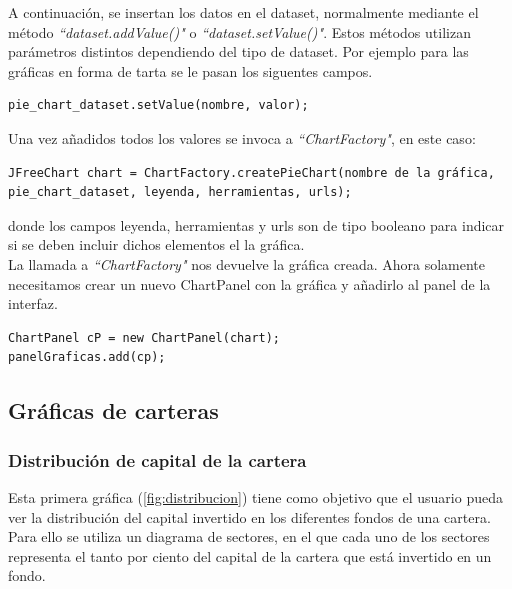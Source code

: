 \documentclass[12pt, a4paper]{book}
\begin{document}
A continuación, se insertan los datos en el dataset, normalmente mediante el método \textit{``dataset.addValue()"} o \textit{``dataset.setValue()"}. Estos métodos utilizan parámetros distintos dependiendo del tipo de dataset. Por ejemplo para las gráficas en forma de tarta se le pasan los siguentes campos.

\begin{verbatim}
pie_chart_dataset.setValue(nombre, valor);
\end{verbatim}

Una vez añadidos todos los valores se invoca a \textit{``ChartFactory"}, en este caso: 

\begin{verbatim}
JFreeChart chart = ChartFactory.createPieChart(nombre de la gráfica,
pie_chart_dataset, leyenda, herramientas, urls);
\end{verbatim}
donde los campos leyenda, herramientas y urls son de tipo booleano para indicar si se deben incluir dichos elementos el la gráfica.\\

La llamada a \textit{``ChartFactory"} nos devuelve la gráfica creada. Ahora solamente necesitamos crear un nuevo ChartPanel con la gráfica y añadirlo al panel de la interfaz.

\begin{verbatim}
ChartPanel cP = new ChartPanel(chart);
panelGraficas.add(cp);
\end{verbatim}
\newpage

\subsection{Gráficas de carteras}

\subsubsection{Distribución de capital de la cartera}

Esta primera gráfica (\ref{fig:distribucion}) tiene como objetivo que el usuario pueda ver la distribución del capital invertido en los diferentes fondos de una cartera. Para ello se utiliza un diagrama de sectores, en el que cada uno de los sectores representa el tanto por ciento del capital de la cartera que está invertido en un fondo.\\
\end{document}
